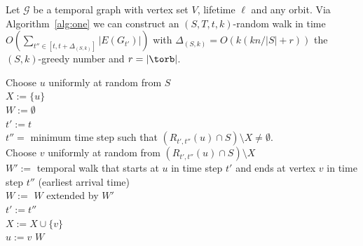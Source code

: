 {\begin{lemma}\label{lem:rand}
    Let $\mathcal{G}$ be a temporal graph with vertex set $V$, lifetime $\ell$
    and   any orbit. Via Algorithm~\ref{alg:one} we can construct an $(S, T,
    t, k)$-random walk in time $O(\sum_{t'' \in [t, t+\Delta_{(S, k)}]} |E(G_{t'})|)$ with
    $\Delta_{(S, k)} =O(k(k n/|S| + r))$ the $(S, k)$-greedy number and $r=|\torb|$.
\end{lemma} 

\begin{algorithm}[h!]
    \caption{Algorithm that constructs an $(S, T, t, k)$-random walk $W$ in time
    linear in the number of temporal edges that exist between time steps $t$
    and $t+\Delta_{(S, k)}$ of the input temporal graph $\mathcal{G}$,
    with $\Delta_{(S, k)}=O(k(k n/|S| + r))$ the $(S, k)$-greedy number
    and $r=|\torb|$.}
    \label{alg:one}
    \DontPrintSemicolon



    Choose $u$ uniformly at random from $S$\\
    $X:=\{u\}$ \\
    $W:=\emptyset$\\
    $t' := t$\\
    {
        $t''=$ minimum time step such that $(R_{t', t''}(u) \cap S) \setminus X \neq \emptyset$.\\
        Choose $v$ uniformly at random from $(R_{t', t''}(u) \cap S) \setminus X$\\
        $W':=$ temporal walk that starts at $u$ in time step $t'$
        and ends at vertex $v$ in time step $t''$ (earliest arrival time)\\
        $W := $ $W$ extended by $W'$\\
        $t':= t''$\\
        $X:=X \cup \{v\}$\\
        $u:=v$
    }
    \Return $W$
\end{algorithm}


}
